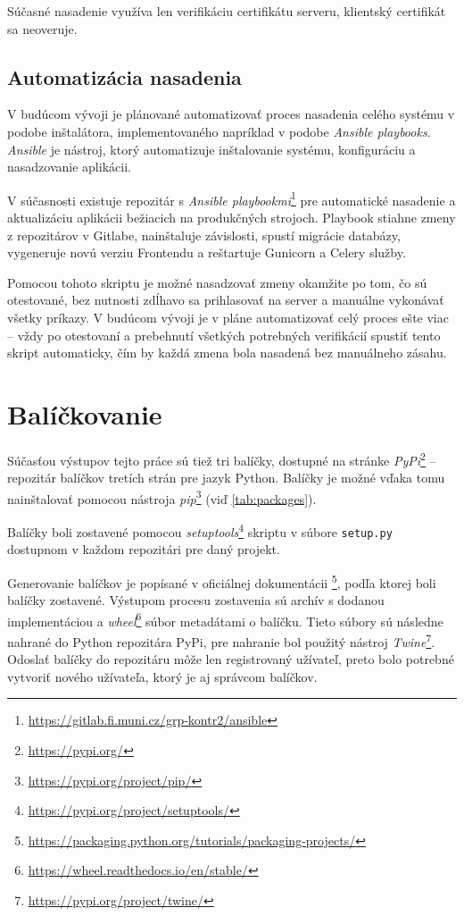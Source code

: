 \documentclass[
  digital, %
  oneside, %
  table,   %
  lof,     %
  lot,   %
]{fithesis3}
\newcommand*{\footurl}[1]{\footnote{\url{#1}}}
\begin{document}
Súčasné nasadenie využíva len verifikáciu certifikátu serveru, klientský certifikát sa neoveruje.

\subsection{Automatizácia nasadenia}

V budúcom vývoji je plánované automatizovať proces nasadenia celého systému v podobe inštalátora, implementovaného napríklad v podobe \emph{Ansible playbooks}. \emph{Ansible} je nástroj, ktorý automatizuje inštalovanie systému, konfiguráciu a nasadzovanie aplikácii\cite{ansible}. 

V súčasnosti existuje repozitár s \emph{Ansible playbookmi}\footnote{\url{https://gitlab.fi.muni.cz/grp-kontr2/ansible}} pre automatické nasadenie a aktualizáciu aplikácii bežiacich na produkčných strojoch. Playbook stiahne zmeny z repozitárov v Gitlabe, nainštaluje závislosti, spustí migrácie databázy, vygeneruje novú verziu Frontendu a reštartuje Gunicorn a Celery služby.

Pomocou tohoto skriptu je možné nasadzovať zmeny okamžite po tom, čo sú otestované, bez nutnosti zdĺhavo sa prihlasovať na server a manuálne vykonávať všetky príkazy. V budúcom vývoji je v pláne automatizovať celý proces ešte viac -- vždy po otestovaní a prebehnutí všetkých potrebných verifikácií spustiť tento skript automaticky, čím by každá zmena bola nasadená bez manuálneho zásahu.

\section{Balíčkovanie}

Súčasťou výstupov tejto práce sú tiež tri balíčky, dostupné na stránke \emph{PyPi}\footurl{https://pypi.org/} -- repozitár balíčkov tretích strán pre jazyk Python. Balíčky je možné vďaka tomu nainštalovať pomocou nástroja \emph{pip}\footurl{https://pypi.org/project/pip/} (viď \ref{tab:packages}).

Balíčky boli zostavené pomocou \emph{setuptools}\footurl{https://pypi.org/project/setuptools/} skriptu v súbore \texttt{setup.py} dostupnom v každom repozitári pre daný projekt.

Generovanie balíčkov je popísané v oficiálnej dokumentácii \footurl{https://packaging.python.org/tutorials/packaging-projects/}, podľa ktorej boli balíčky zostavené. Výstupom procesu zostavenia sú archív s dodanou implementáciou a \emph{wheel}\footurl{https://wheel.readthedocs.io/en/stable/} súbor metadátami o balíčku. Tieto súbory sú následne nahrané do Python repozitára PyPi, pre nahranie bol použitý nástroj \emph{Twine}\footurl{https://pypi.org/project/twine/}. Odoslať balíčky do repozitáru môže len registrovaný užívateľ, preto bolo potrebné vytvoriť nového užívateľa, ktorý je aj správcom balíčkov.
\end{document}
